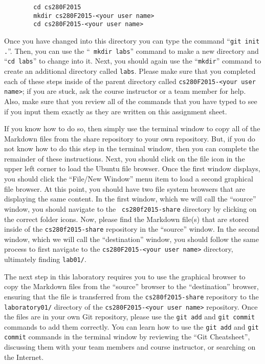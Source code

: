     \begin{verbatim}
        cd cs280F2015
        mkdir cs280F2015-<your user name>
        cd cs280F2015-<your user name>
    \end{verbatim}
    \vspace*{-.2in}


Once you have changed into this directory you can type the command ``{\tt git init .}''. Then, you can use the ``{\tt
mkdir labs}'' command to make a new directory and ``{\tt cd labs}'' to change into it.  Next, you should
again use the ``{\tt mkdir}'' command to create an additional directory called {\tt labs}.  Please make sure that
you completed each of these steps inside of the parent directory called {\tt cs280F2015-<your user name>}; if you are
stuck, ask the course instructor or a team member for help. Also, make sure that you review all of the commands
that you have typed to see if you input them exactly as they are written on this assignment sheet.

If you know how to do so, then simply use the terminal window to copy all of the Markdown files from the share
repository to your own repository. But, if you do not know how to do this step in the terminal window, then you can
complete the remainder of these instructions. Next, you should click on the file icon in the upper left corner to load
the Ubuntu file browser.  Once the first window displays, you should click the ``File/New Window'' menu item to load a
second graphical file browser. At this point, you should have two file system browsers that are displaying the same
content.  In the first window, which we will call the ``source'' window, you should navigate to the {\tt
cs280f2015-share} directory by clicking on the correct folder icons.  Now, please find the Markdown file(s) that
are stored inside of the {\tt cs280f2015-share} repository in the ``source'' window. In the second window, which we will
call the ``destination'' window, you should follow the same process to first navigate to the {\tt cs280F2015-<your user
name>} directory, ultimately finding {\tt lab01/}.

The next step in this laboratory requires you to use the graphical browser to copy the Markdown files from the
``source'' browser to the ``destination'' browser, ensuring that the file is transferred from the {\tt cs280f2015-share}
repository to the {\tt laboratory01/} directory of the {\tt cs280F2015-<your user name>} repository.  Once the files are
in your own Git repository, please use the {\tt git add} and {\tt git commit} commands to add them correctly. You can
learn how to use the {\tt git add} and {\tt git commit} commands in the terminal window by reviewing the ``Git
Cheatsheet'', discussing them with your team members and course instructor, or searching on the Internet.

